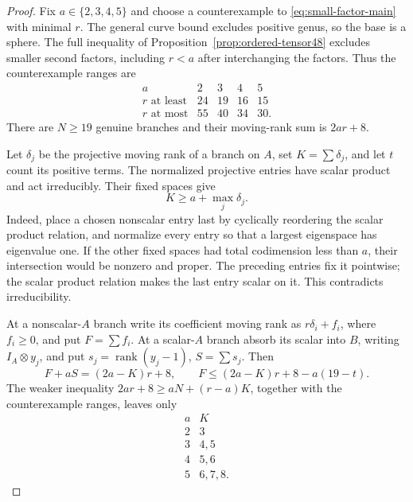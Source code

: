 \documentclass[11pt]{article}
\theoremstyle{definition}
\theoremstyle{remark}
\begin{document}
\begin{proof}
Fix $a\in\{2,3,4,5\}$ and choose a counterexample to
\eqref{eq:small-factor-main} with minimal $r$.
The general curve bound excludes positive genus, so the base
is a sphere. The full inequality of Proposition~\ref{prop:ordered-tensor48}
excludes smaller second factors, including $r<a$ after
interchanging the factors.  Thus the counterexample ranges are
\[
\begin{array}{c|rrrr}
 a&2&3&4&5\\ \hline
 r\text{ at least}&24&19&16&15\\
 r\text{ at most}&55&40&34&30.
\end{array}
\]
There are $N\geq19$ genuine branches
and their moving-rank sum is $2ar+8$.

Let $\delta_j$ be the projective moving rank of a branch on
$A$, set $K=\sum\delta_j$, and let $t$ count its positive
terms.  The normalized projective entries have scalar product
and act irreducibly.  Their fixed spaces give
\begin{equation}\label{eq:small-factor-projective}
                         K\geq a+\max_j\delta_j.
\end{equation}
Indeed, place a chosen nonscalar entry last by cyclically
reordering the scalar product relation, and normalize every
entry so that a largest eigenspace has eigenvalue one.
If the other fixed spaces had total codimension less than
$a$, their intersection would be nonzero and proper.
The preceding entries fix it pointwise; the scalar product
relation makes the last entry scalar on it.
This contradicts irreducibility.

At a nonscalar-$A$ branch write its coefficient moving rank as
$r\delta_i+f_i$, where $f_i\geq0$, and put $F=\sum f_i$.
At a scalar-$A$ branch absorb its scalar into $B$, writing
$I_A\otimes y_j$, and put
$s_j=\operatorname{rank}(y_j-1)$, $S=\sum s_j$.
Then
\begin{equation}\label{eq:small-factor-budget}
 F+aS=(2a-K)r+8,\qquad
 F\leq(2a-K)r+8-a(19-t).
\end{equation}
The weaker inequality
$2ar+8\geq aN+(r-a)K$, together with the counterexample
ranges, leaves only
\[
\begin{array}{c|c}
 a&K\\ \hline
 2&3\\
 3&4,5\\
 4&5,6\\
 5&6,7,8.
\end{array}
\]


\end{proof}
\end{document}

